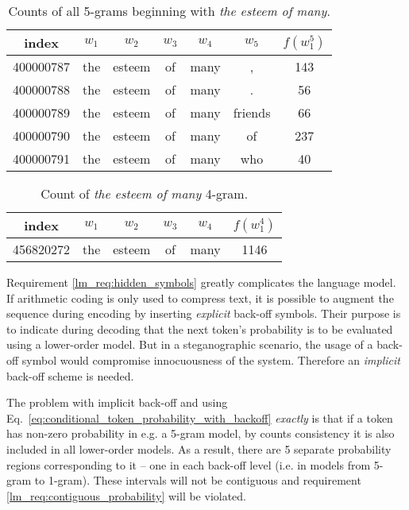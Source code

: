 \documentclass{IIBproject}
\makeatletter
\newcommand*{\eg}{e.g.\@\xspace}
\newcommand*{\ie}{i.e.\@\xspace}
\makeatother
\begin{document}
\begin{table}[h]
	\centering
	\begin{tabular}{c | *{5}{| c} || c}
	index & $w_1$ & $w_2$ & $w_3$ & $w_4$ & $w_5$ & $f(w_1^5)$ \\
	\hline
	\num{400000787} & the & esteem & of & many & , & 143 \\
	\num{400000788} & the & esteem & of & many & . & 56 \\
	\num{400000789} & the & esteem & of & many & friends & 66 \\
	\num{400000790} & the & esteem & of & many & of & 237 \\
	\num{400000791} & the & esteem & of & many & who & 40
	\end{tabular}
	\caption{\label{tab:the_esteem_of_many_CONT}Counts of all 5-grams beginning with \emph{the esteem of many}.}
\end{table}

\begin{table}[h]
	\centering
	\begin{tabular}{c | *{4}{| c} || c}
	index & $w_1$ & $w_2$ & $w_3$ & $w_4$ & $f(w_1^4)$ \\
	\hline
	\num{456820272} & the & esteem & of & many & 1146
	\end{tabular}
	\caption{\label{tab:the_esteem_of_many}Count of \emph{the esteem of many} 4-gram.}
\end{table}

Requirement \ref{lm_req:hidden_symbols} greatly complicates the language model. If arithmetic coding is only used to compress text, it is possible to augment the sequence during encoding by inserting \emph{explicit} back-off symbols. Their purpose is to indicate during decoding that the next token's probability is to be evaluated using a lower-order model. But in a steganographic scenario, the usage of a back-off symbol would compromise innocuousness of the system. Therefore an \emph{implicit} back-off scheme is needed.

The problem with implicit back-off and using Eq.~\ref{eq:conditional_token_probability_with_backoff} \emph{exactly} is that if a token has non-zero probability in \eg a 5-gram model, by counts consistency it is also included in all lower-order models. As a result, there are 5 separate probability regions corresponding to it -- one in each back-off level (\ie in models from 5-gram to 1-gram). These intervals will not be contiguous and requirement \ref{lm_req:contiguous_probability} will be violated.
\end{document}
